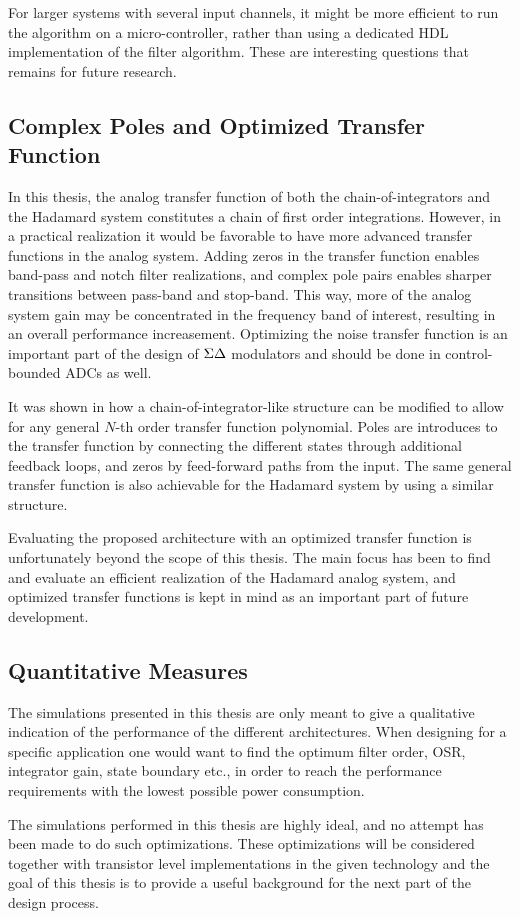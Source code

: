 For larger systems with several input channels, it might be more efficient to run the algorithm on a micro-controller, rather than using a dedicated HDL implementation of the filter algorithm. These are interesting questions that remains for future research.


\subsection{Complex Poles and Optimized Transfer Function}
In this thesis, the analog transfer function of both the chain-of-integrators and the Hadamard system constitutes a chain of first order integrations. However, in a practical realization it would be favorable to have more advanced transfer functions in the analog system. Adding zeros in the transfer function enables band-pass and notch filter realizations, and complex pole pairs enables sharper transitions between pass-band and stop-band. This way, more of the analog system gain may be concentrated in the frequency band of interest, resulting in an overall performance increasement. Optimizing the noise transfer function is an important part of the design of $\Sigma\Delta$ modulators and should be done in control-bounded ADCs as well.

It was shown in \cite{malmberg_thesis} how a chain-of-integrator-like structure can be modified to allow for any general $N$-th order transfer function polynomial. Poles are introduces to the transfer function by connecting the different states through additional feedback loops, and zeros by feed-forward paths from the input. The same general transfer function is also achievable for the Hadamard system by using a similar structure.

Evaluating the proposed architecture with an optimized transfer function is unfortunately beyond the scope of this thesis. The main focus has been to find and evaluate an efficient realization of the Hadamard analog system, and optimized transfer functions is kept in mind as an important part of future development.



\subsection{Quantitative Measures}
The simulations presented in this thesis are only meant to give a qualitative indication of the performance of the different architectures. When designing for a specific application one would want to find the optimum filter order, OSR, integrator gain, state boundary etc., in order to reach the performance requirements with the lowest possible power consumption.

The simulations performed in this thesis are highly ideal, and no attempt has been made to do such optimizations. These optimizations will be considered together with transistor level implementations in the given technology and the goal of this thesis is to provide a useful background for the next part of the design process.



